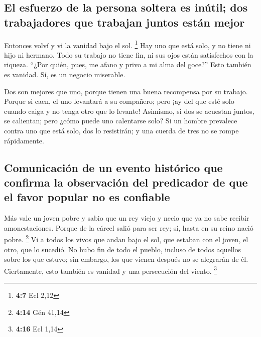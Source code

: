 \begin{paracol}{2}
\hypertarget{el-esfuerzo-de-la-persona-soltera-es-inuxfatil-dos-trabajadores-que-trabajan-juntos-estuxe1n-mejor}{%
\subsection{El esfuerzo de la persona soltera es inútil; dos
trabajadores que trabajan juntos están
mejor}\label{el-esfuerzo-de-la-persona-soltera-es-inuxfatil-dos-trabajadores-que-trabajan-juntos-estuxe1n-mejor}}

 Entonces volví y vi la vanidad bajo el sol. \footnote{\textbf{4:7}
  Ecl 2,12}  Hay uno que está solo, y no tiene ni hijo ni
hermano. Todo su trabajo no tiene fin, ni sus ojos están satisfechos con
la riqueza. ``¿Por quién, pues, me afano y privo a mi alma del goce?''
Esto también es vanidad. Sí, es un negocio miserable.

 Dos son mejores que uno, porque tienen una buena
recompensa por su trabajo.  Porque si caen, el uno
levantará a su compañero; pero ¡ay del que esté solo cuando caiga y no
tenga otro que lo levante!  Asimismo, si dos se acuestan
juntos, se calientan; pero ¿cómo puede uno calentarse solo?
 Si un hombre prevalece contra uno que está solo, dos lo
resistirán; y una cuerda de tres no se rompe rápidamente.

\hypertarget{comunicaciuxf3n-de-un-evento-histuxf3rico-que-confirma-la-observaciuxf3n-del-predicador-de-que-el-favor-popular-no-es-confiable}{%
\subsection{Comunicación de un evento histórico que confirma la
observación del predicador de que el favor popular no es
confiable}\label{comunicaciuxf3n-de-un-evento-histuxf3rico-que-confirma-la-observaciuxf3n-del-predicador-de-que-el-favor-popular-no-es-confiable}}

 Más vale un joven pobre y sabio que un rey viejo y necio
que ya no sabe recibir amonestaciones.  Porque de la
cárcel salió para ser rey; sí, hasta en su reino nació pobre.
\footnote{\textbf{4:14} Gén 41,14}  Vi a todos los vivos
que andan bajo el sol, que estaban con el joven, el otro, que lo
sucedió.  No hubo fin de todo el pueblo, incluso de todos
aquellos sobre los que estuvo; sin embargo, los que vienen después no se
alegrarán de él. Ciertamente, esto también es vanidad y una persecución
del viento. \footnote{\textbf{4:16} Ecl 1,14}


\end{paracol}
